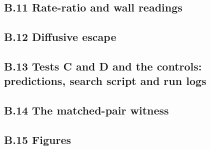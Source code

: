 \documentclass[11pt]{article}
\begin{document}
\subsection*{B.11 Rate-ratio and wall readings}




\subsection*{B.12 Diffusive escape}


\subsection*{B.13 Tests C and D and the controls: predictions, search script and run logs}








\subsection*{B.14 The matched-pair witness}








\subsection*{B.15 Figures}



\end{document}

